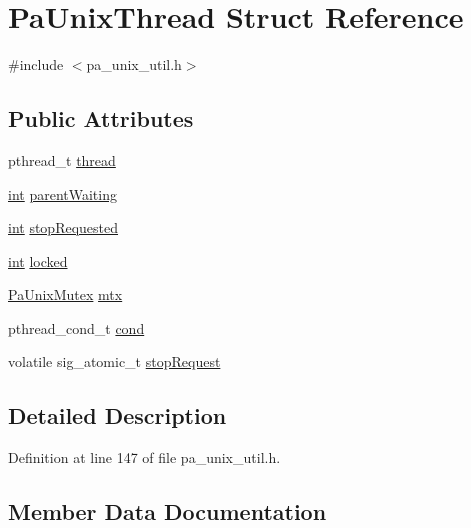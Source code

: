 \hypertarget{struct_pa_unix_thread}{}\section{Pa\+Unix\+Thread Struct Reference}
\label{struct_pa_unix_thread}


{\ttfamily \#include $<$pa\+\_\+unix\+\_\+util.\+h$>$}

\subsection*{Public Attributes}
\begin{DoxyCompactItemize}
\item 
pthread\+\_\+t \hyperlink{struct_pa_unix_thread_ad00e0ea927d1c0f830984c9d7c70d41b}{thread}
\item 
\hyperlink{xmltok_8h_a5a0d4a5641ce434f1d23533f2b2e6653}{int} \hyperlink{struct_pa_unix_thread_a1a0caeed9f5d8be47721158331702d0b}{parent\+Waiting}
\item 
\hyperlink{xmltok_8h_a5a0d4a5641ce434f1d23533f2b2e6653}{int} \hyperlink{struct_pa_unix_thread_a2a258652e189a8f35af9726192713773}{stop\+Requested}
\item 
\hyperlink{xmltok_8h_a5a0d4a5641ce434f1d23533f2b2e6653}{int} \hyperlink{struct_pa_unix_thread_af9983a628000e65ff4740f65eb81002f}{locked}
\item 
\hyperlink{struct_pa_unix_mutex}{Pa\+Unix\+Mutex} \hyperlink{struct_pa_unix_thread_a37549f65c3b18dc1d0a3620508536c1e}{mtx}
\item 
pthread\+\_\+cond\+\_\+t \hyperlink{struct_pa_unix_thread_a299169d46cc51d9a198f97d55e0b8548}{cond}
\item 
volatile sig\+\_\+atomic\+\_\+t \hyperlink{struct_pa_unix_thread_a32c4ee3320efe420b56a6ccf42097627}{stop\+Request}
\end{DoxyCompactItemize}


\subsection{Detailed Description}


Definition at line 147 of file pa\+\_\+unix\+\_\+util.\+h.



\subsection{Member Data Documentation}
